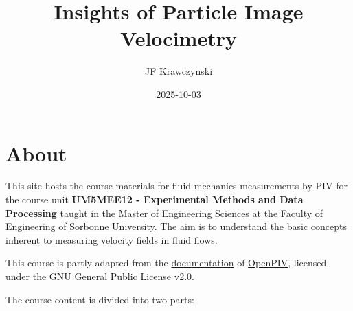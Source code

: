 \documentclass[
  english,
  letterpaper,
  numbers=noendperiod,
  DIV=13]{scrreprt}
\title{Insights of Particle Image Velocimetry}
\author{JF Krawczynski}
\date{2025-10-03}
\renewcommand*\contentsname{Table of contents}
\newcommand\contentsname{Table of contents}
\begin{document}
\maketitle

\renewcommand*\contentsname{Table of contents}
{
\hypersetup{linkcolor=}
\setcounter{tocdepth}{2}
\tableofcontents
}


\chapter*{About}\label{about}


This site hosts the course materials for fluid mechanics measurements by
PIV for the course unit \textbf{UM5MEE12 - Experimental Methods and Data
Processing} taught in the
\href{https://masters-sdi.sorbonne-universite.fr/la-mention-mecanique}{Master
of Engineering Sciences} at the
\href{https://sciences.sorbonne-universite.fr/faculte/ufr-instituts-observatoires-ecoles/ufr-dingenierie}{Faculty
of Engineering} of \href{https://www.sorbonne-universite.fr/}{Sorbonne
University}. The aim is to understand the basic concepts inherent to
measuring velocity fields in fluid flows.

\begin{tcolorbox}[enhanced jigsaw, left=2mm, bottomtitle=1mm, rightrule=.15mm, opacitybacktitle=0.6, breakable, toprule=.15mm, bottomrule=.15mm, titlerule=0mm, colback=white, arc=.35mm, leftrule=.75mm, title=\textcolor{quarto-callout-note-color}{\faInfo}\hspace{0.5em}{Note}, toptitle=1mm, colframe=quarto-callout-note-color-frame, colbacktitle=quarto-callout-note-color!10!white, opacityback=0, coltitle=black]

This course is partly adapted from the
\href{https://github.com/OpenPIV/openpiv-python}{documentation} of
\href{https://doi.org/10.5281/zenodo.4409178}{OpenPIV}, licensed under
the GNU General Public License v2.0.

\end{tcolorbox}

The course content is divided into two parts:
\end{document}
